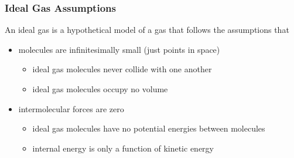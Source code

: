 \subsubsection{Ideal Gas Assumptions}
An ideal gas is a hypothetical model of a gas that follows the assumptions that
\begin{itemize}
	\item molecules are infinitesimally small (just points in space)
    \begin{itemize}
        \item ideal gas molecules never collide with one another
        \item ideal gas molecules occupy no volume
    \end{itemize} 
	\item intermolecular forces are zero
    \begin{itemize}
        \item ideal gas molecules  have no potential energies between molecules
        \item internal energy is only a function of kinetic energy
    \end{itemize}
\end{itemize}
\vspace{12pt}

